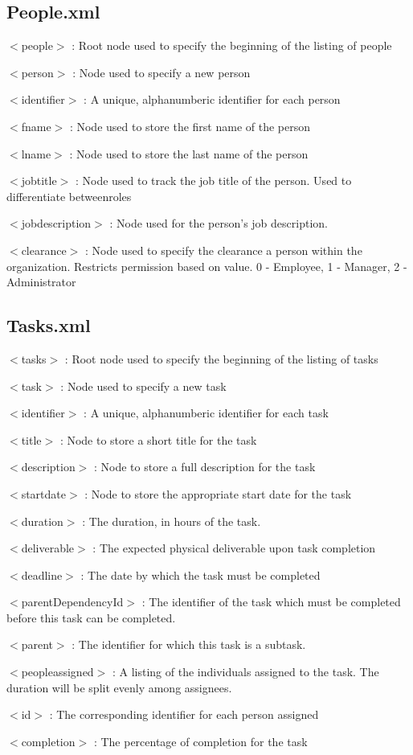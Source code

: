 \documentclass[12pt]{article}
\begin{document}
\subsection{People.xml}
{
$<$people$>$ : Root node used to specify the beginning of the listing of people

$<$person$>$ : Node used to specify a new person

$<$identifier$>$ : A unique, alphanumberic identifier for each person

$<$fname$>$ : Node used to store the first name of the person

$<$lname$>$ : Node used to store the last name of the person

$<$jobtitle$>$ : Node used to track the job title of the person. Used to differentiate betweenroles

$<$jobdescription$>$ : Node used for the person's job description.

$<$clearance$>$ : Node used to specify the clearance a person within the organization. Restricts permission based on value. 0 - Employee, 1 - Manager, 2 - Administrator
}
\subsection{Tasks.xml}
{
$<$tasks$>$ : Root node used to specify the beginning of the listing of tasks

$<$task$>$ : Node used to specify a new task

$<$identifier$>$ : A unique, alphanumberic identifier for each task

$<$title$>$ : Node to store a short title for the task

$<$description$>$ : Node to store a full description for the task

$<$startdate$>$ : Node to store the appropriate start date for the task

$<$duration$>$ : The duration, in hours of the task.

$<$deliverable$>$ : The expected physical deliverable upon task completion

$<$deadline$>$ : The date by which the task must be completed

$<$parentDependencyId$>$ : The identifier of the task which must be completed before this task can be completed.

$<$parent$>$ : The identifier for which this task is a subtask.

$<$peopleassigned$>$ : A listing of the individuals assigned to the task. The duration will be split evenly among assignees.

$<$id$>$ : The corresponding identifier for each person assigned

$<$completion$>$ : The percentage of completion for the task
}
\end{document}
